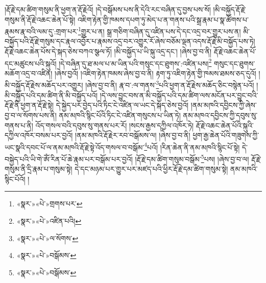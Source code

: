 །རྡོ་རྗེ་དམ་ཚིག་གསུམ་ནི་ཕྱག་ན་རྡོ་རྗེའོ། །དེ་བསྒོམས་པས་ནི་དེའི་རང་བཞིན་དུ་བྱས་པས་སོ། །མི་བསྐྱོད་རྡོ་རྗེ་གསུམ་ནི་རྡོ་རྗེ་འཆང་ཆེན་པོ་སྟེ། འཇིག་རྟེན་གྱི་ཁམས་དཔག་ཏུ་མེད་པ་ན་གནས་པའི་སྒྲ་རྣམ་པ་སྣ་ཚོགས་པ་རྣམས་རྣ་བའི་ལམ་དུ་:གྲག་པར་\footnote{«སྣར་»«པེ་»གྲགས་པར་}གྱུར་པ་ན། སྒྲ་གཅིག་བཞིན་དུ་འཛིན་པས་དེ་དང་འདྲ་བར་གྱུར་པས་ན། མི་བསྐྱོད་པའི་རྡོ་རྗེ་གསུམ་དང་རྣལ་འབྱོར་པ་རྣམས་འདྲ་བར་འགྱུར་རོ་ཞེས་བཅོམ་ལྡན་འདས་རྡོ་རྗེ་མི་བསྐྱོད་པས་ཏེ། རྡོ་རྗེ་འཆང་ཆེན་པོས་དེ་སྐད་ཅེས་བཀའ་སྩལ་ཏོ། །མི་བསྐྱོད་པ་ཡི་སྐུ་འདྲ་དང་། །ཞེས་བྱ་བ་ནི། རྡོ་རྗེ་འཆང་ཆེན་པོ་དང་མཚུངས་པའི་སྐུའོ། །དེ་བཞིན་དུ་ཐ་མལ་པ་མ་ཡིན་པའི་གསུང་དང་ཐུགས་:འཛིན་པས།\footnote{«སྣར་»«པེ་»འཛིན་པའི།} གསུང་དང་ཐུགས་མཆོག་འདྲ་བ་འཛིན། །ཞེས་བྱའོ། །འཇིག་རྟེན་ཁམས་ཞེས་བྱ་བ་ནི། རྟག་ཏུ་འཇིག་རྟེན་གྱི་ཁམས་ཐམས་ཅད་དུའོ། །མི་བསྐྱོད་རྡོ་རྗེས་མཆོད་པར་འགྱུར། །ཞེས་བྱ་བ་ནི། རྣ་བ་:ལ་གནས་\footnote{«སྣར་»«པེ་»ལ་སོགས་}པའི་ཕྱག་ན་རྡོ་རྗེས་མཆོད་ཅིང་བསྙེན་པའོ། །མི་བསྐྱོད་པའི་དམ་ཚིག་ནི་མི་བསྐྱོད་པའོ། །དེ་ལས་བྱུང་བས་ན་མི་བསྐྱོད་པའི་དམ་ཚིག་ལས་མངོན་པར་བྱུང་བའི་རྡོ་རྗེ་ནི་ཕྱག་ན་རྡོ་རྗེ་སྟེ། དེ་སྐྱེད་པར་བྱེད་པའི་ཏིང་ངེ་འཛིན་ལ་ཡང་དེ་སྐད་ཅེས་བྱའོ། །ནམ་མཁའི་དབྱིངས་ཀྱི་ཞེས་བྱ་བ་ལ་སོགས་པས་ནི། ནམ་མཁའི་སྙིང་པོའི་ཏིང་ངེ་འཛིན་གསུངས་པ་ཡིན་ཏེ། ནམ་མཁའ་དབྱིངས་ཀྱི་དབུས་སུ་གནས་པ་ནི། འོད་གསལ་བའི་དབུས་སུ་གནས་པར་རོ། །སངས་རྒྱས་དཀྱིལ་འཁོར་ཏེ། རྡོ་རྗེ་འཆང་ཆེན་པོའི་སྐུའི་དཀྱིལ་འཁོར་བསམ་པར་བྱའོ། །ནམ་མཁའི་རྡོ་རྗེར་རབ་བསྒོམས་ལ། །ཞེས་བྱ་བ་ནི། ཕྱག་རྒྱ་ཆེན་པོའི་གཟུགས་ཀྱི་ཡང་སྣའི་དབང་པོ་ལ་ནམ་མཁའི་རྡོ་རྗེ་སྟེ་འོད་གསལ་བ་བསྒོམ་\footnote{«སྣར་»«པེ་»བསྒོམས་}པའོ། །རིན་ཆེན་ནི་ནམ་མཁའི་སྙིང་པོ་སྟེ། དེ་བསྐྱེད་པའི་ཡི་གེ་ཨོཾ་རིན་པོ་ཆེ་རྣམ་པར་བསྒོམ་པར་བྱའོ། །རྡོ་རྗེ་དམ་ཚིག་གསུམ་བསྒོམ་\footnote{«སྣར་»«པེ་»བསྒོམས་}པས། །ཞེས་བྱ་བ་ལ། རྡོ་རྗེ་གསུམ་ནི་དྲི་རྣམ་པ་གསུམ་སྟེ། དེ་དང་མཉམ་པར་གྱུར་པར་མཛད་པའི་ཕྱིར་རྡོ་རྗེ་དམ་ཚིག་གསུམ་སྟེ། ནམ་མཁའི་སྙིང་པོའོ། །
